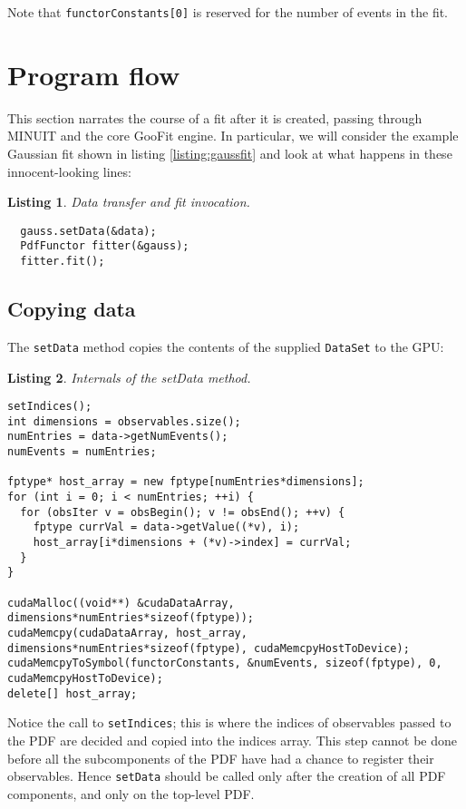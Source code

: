 \documentclass[12pt,pdflatex]{article}
\newtheorem{listing}{Listing}
\begin{document}
Note that \verb|functorConstants[0]| is reserved for the number of events
in the fit. 

\section{Program flow} 
\label{sec:engine}

This section narrates the course of a fit after it is created, passing through
MINUIT and the core GooFit engine. In particular, we will consider the example
Gaussian fit shown in listing \ref{listing:gaussfit} and look at what happens
in these innocent-looking lines:
\begin{listing}
\label{listing:actualfit}
Data transfer and fit invocation.

\begin{verbatim}
  gauss.setData(&data);
  PdfFunctor fitter(&gauss); 
  fitter.fit(); 
\end{verbatim}
\end{listing} 

\subsection{Copying data} 

The \texttt{setData} method copies the contents of the supplied \texttt{DataSet}
to the GPU:
\begin{listing}
\label{listing:setData}
Internals of the setData method.

\begin{verbatim}
setIndices();
int dimensions = observables.size();
numEntries = data->getNumEvents(); 
numEvents = numEntries; 

fptype* host_array = new fptype[numEntries*dimensions];
for (int i = 0; i < numEntries; ++i) {
  for (obsIter v = obsBegin(); v != obsEnd(); ++v) {
    fptype currVal = data->getValue((*v), i);
    host_array[i*dimensions + (*v)->index] = currVal; 
  }
}

cudaMalloc((void**) &cudaDataArray, dimensions*numEntries*sizeof(fptype)); 
cudaMemcpy(cudaDataArray, host_array, dimensions*numEntries*sizeof(fptype), cudaMemcpyHostToDevice);
cudaMemcpyToSymbol(functorConstants, &numEvents, sizeof(fptype), 0, cudaMemcpyHostToDevice); 
delete[] host_array; 
\end{verbatim}
\end{listing} 
Notice the call to \texttt{setIndices}; this is where the indices
of observables passed to the PDF are decided and copied into the indices
array. This step cannot be done before all the subcomponents of the 
PDF have had a chance to register their observables. Hence \texttt{setData}
should be called only after the creation of all PDF components, and only
on the top-level PDF. 
\end{document}

